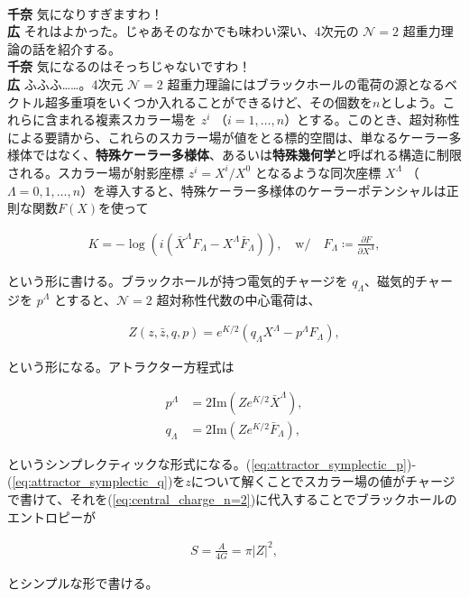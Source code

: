 \documentclass[paper=b5j,fontsize=12Q,jafontsize=12Q,baselineskip=21Q]{jlreq}
\DeclareRobustCommand{\hiron}{\textbf{広 }}
\DeclareRobustCommand{\chinan}{\textbf{千奈 }}
\begin{document}
\begin{refsection}
\\\chinan 気になりすぎますわ！
\\\hiron それはよかった。じゃあそのなかでも味わい深い、4次元の $\mathcal{N}=2$ 超重力理論の話を紹介する。
\\\chinan 気になるのはそっちじゃないですわ！
\\\hiron ふふふ……。4次元 $\mathcal{N}=2$ 超重力理論にはブラックホールの電荷の源となるベクトル超多重項をいくつか入れることができるけど、その個数を$n$としよう。これらに含まれる複素スカラー場を $z^i$ （$i = 1, \dots, n$）とする。このとき、超対称性による要請から、これらのスカラー場が値をとる標的空間は、単なるケーラー多様体ではなく、\textbf{特殊ケーラー多様体}、あるいは\textbf{特殊幾何学}と呼ばれる構造に制限される。スカラー場が射影座標 $z^i = X^i / X^0$ となるような同次座標 $X^\Lambda$ （$\Lambda = 0, 1, \dots, n$）を導入すると、特殊ケーラー多様体のケーラーポテンシャルは正則な関数$F(X)$を使って
\begin{tcolorbox}
\begin{align}
  K = -\log\left( i (\bar{X}^\Lambda F_\Lambda - X^\Lambda \bar{F}_\Lambda) \right), \quad \mathrm{w/} \quad F_\Lambda \coloneqq \frac{\partial F}{\partial X^\Lambda},
\end{align}
\end{tcolorbox}
という形に書ける。ブラックホールが持つ電気的チャージを $q_\Lambda$、磁気的チャージを $p^\Lambda$ とすると、$\mathcal{N}=2$ 超対称性代数の中心電荷は、
\begin{tcolorbox}
\begin{align}
  Z(z, \bar{z}, q, p) = e^{K/2} (q_\Lambda X^\Lambda - p^\Lambda F_\Lambda),\label{eq:central_charge_n=2}
\end{align}
\end{tcolorbox}
という形になる。アトラクター方程式は
\begin{tcolorbox}
\begin{align}
  p^\Lambda &= 2 \text{Im} (Z e^{K/2} \bar{X}^\Lambda),\label{eq:attractor_symplectic_p}\\
  q_\Lambda &= 2 \text{Im} (Z e^{K/2} \bar{F}_\Lambda),\label{eq:attractor_symplectic_q}
\end{align}
\end{tcolorbox}
というシンプレクティックな形式になる。(\ref{eq:attractor_symplectic_p})-(\ref{eq:attractor_symplectic_q})を$z$について解くことでスカラー場の値がチャージで書けて、それを(\ref{eq:central_charge_n=2})に代入することでブラックホールのエントロピーが
\begin{tcolorbox}
\begin{align}
  S = \frac{A}{4G} = \pi |Z|^2,
\end{align}
\end{tcolorbox}
とシンプルな形で書ける。


\end{refsection}
\end{document}
